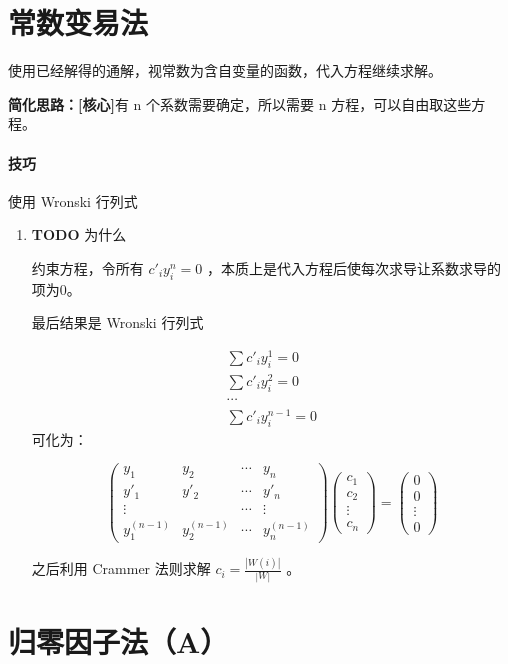 \documentclass[11pt]{report}
\begin{document}
\section{常数变易法}
\label{sec:orgf64326a}
使用已经解得的通解，视常数为含自变量的函数，代入方程继续求解。

\textbf{简化思路：[核心]}有 n 个系数需要确定，所以需要 n 方程，可以自由取这些方程。

\paragraph{技巧}
使用 Wronski 行列式


\begin{enumerate}
\item {\bfseries\sffamily TODO} 为什么
\label{sec:org8fdf6a1}

约束方程，令所有 \(c'_iy^n_i=0\) ，本质上是代入方程后使每次求导让系数求导的项为0。

最后结果是 Wronski 行列式

\begin{eqnarray*}
\label{eq:2}
\sum c'_iy_i^1=0\\
\sum c'_iy_i^2=0\\
\cdots\\
\sum c'_iy_i^{n-1}=0
\end{eqnarray*}
可化为：

\begin{equation}
\label{eq:5}
\begin{pmatrix}
y_1&y_2&\cdots&y_n\\
y'_1&y'_2&\cdots&y'_n\\
\vdots&&\cdots&\vdots\\
y^{(n-1)}_1&y^{(n-1)}_2&\cdots&y^{(n-1)}_n
\end{pmatrix}
\begin{pmatrix}
c_1\\c_2\\\vdots\\c_n
\end{pmatrix}
=
\begin{pmatrix}
0\\0\\\vdots\\0
\end{pmatrix}
\end{equation}

之后利用 Crammer 法则求解 \(c_i=\frac{|W(i)|}{|W|}\) 。
\end{enumerate}
\section{归零因子法（A）}
\label{sec:org5d31132}
\end{document}
